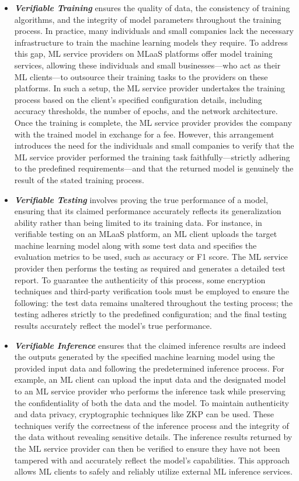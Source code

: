 \documentclass[journal]{IEEEtran}
\begin{document}
\begin{itemize}
    \item {\bf \emph{Verifiable Training}} ensures the quality of data, the consistency of training algorithms, and the integrity of model parameters throughout the training process. In practice, many individuals and small companies lack the necessary infrastructure to train the machine learning models they require. To address this gap, ML service providers on MLaaS platforms offer model training services, allowing these individuals and small businesses---who act as their ML clients---to outsource their training tasks to the providers on these platforms. In such a setup, the ML service provider undertakes the training process based on the client's specified configuration details, including accuracy thresholds, the number of epochs, and the network architecture. Once the training is complete, the ML service provider provides the company with the trained model in exchange for a fee. However, this arrangement introduces the need for the individuals and small companies to verify that the ML service provider performed the training task faithfully---strictly adhering to the predefined requirements---and that the returned model is genuinely the result of the stated training process.

    \item  {\bf \emph{Verifiable Testing}} involves proving the true performance of a model, ensuring that its claimed performance accurately reflects its generalization ability rather than being limited to its training data. For instance, in verifiable testing on an MLaaS platform, an ML client uploads the target machine learning model along with some test data and specifies the evaluation metrics to be used, such as accuracy or F1 score. The ML service provider then performs the testing as required and generates a detailed test report. To guarantee the authenticity of this process, some encryption techniques and third-party verification tools must be employed to ensure the following: the test data remains unaltered throughout the testing process; the testing adheres strictly to the predefined configuration; and the final testing results accurately reflect the model's true performance.

    \item  {\bf  \emph{Verifiable Inference}} ensures that the claimed inference results are indeed the outputs generated by the specified machine learning model using the provided input data and following the predetermined inference process. For example, an ML client can upload the input data and the designated model to an ML service provider who performs the inference task while preserving the confidentiality of both the data and the model. To maintain authenticity and data privacy, cryptographic techniques like ZKP can be used. These techniques verify the correctness of the inference process and the integrity of the data without revealing sensitive details. The inference results returned by the ML service provider can then be verified to ensure they have not been tampered with and accurately reflect the model's capabilities. This approach allows ML clients to safely and reliably utilize external ML inference services. 
\end{itemize}
\end{document}
